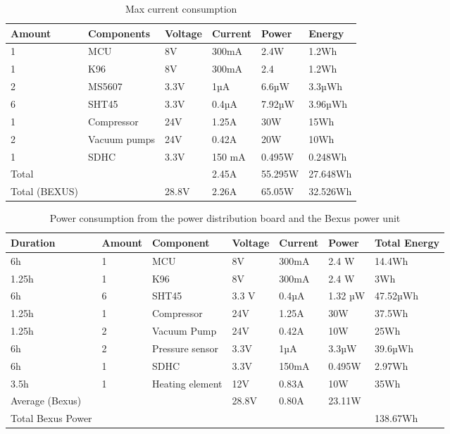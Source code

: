\documentclass[
  a4paper,
  11pt,
  openany,
  parskip,
  toc=totoc,
  listof=totoc,
  bibliography=totoc
]{scrreprt}
\begin{document}
\begin{table}[H]
\centering
\caption{Max current consumption}
\label{tab:current_consumption}
\begin{tabular}{llllll}
\toprule
\textbf{Amount} & \textbf{Components}& \textbf{Voltage} & \textbf{Current} &\textbf{Power} &\textbf{Energy}\\
\midrule
1 & MCU & 8V & 300mA & 2.4W & 1.2Wh\\
1 & K96 & 8V & 300mA & 2.4 & 1.2Wh \\
2 & MS5607 & 3.3V& 1µA & 6.6µW & 3.3µWh \\
6 & SHT45 & 3.3V & 0.4µA & 7.92µW & 3.96µWh \\
1 & Compressor & 24V & 1.25A & 30W & 15Wh \\
2 & Vacuum pumps & 24V & 0.42A & 20W & 10Wh\\
1 & SDHC & 3.3V & 150 mA & 0.495W & 0.248Wh \\
\midrule
Total &&& 2.45A & 55.295W & 27.648Wh\\
Total (BEXUS) &&28.8V& 2.26A & 65.05W & 32.526Wh \\
\bottomrule
\end{tabular}
\end{table}

\begin{table}[H]
\centering
\caption{Power consumption from the power distribution board and the Bexus power unit}
\label{tab:power_consumption}
\begin{tabular}{L{1.6cm}llllll}
\toprule
\textbf{Duration} & \textbf{Amount} & \textbf{Component} & \textbf{Voltage} & \textbf{Current} & \textbf{Power} & \textbf{Total Energy} \\
\midrule
6h & 1 & MCU & 8V & 300mA & 2.4 W & 14.4Wh \\
1.25h & 1 & K96 & 8V & 300mA & 2.4 W & 3Wh \\
6h & 6 & SHT45 & 3.3 V & 0.4µA & 1.32 µW & 47.52µWh \\
1.25h & 1 & Compressor & 24V & 1.25A & 30W & 37.5Wh \\
1.25h & 2 & Vacuum Pump & 24V & 0.42A & 10W & 25Wh \\
6h & 2 & Pressure sensor & 3.3V & 1µA & 3.3µW & 39.6µWh \\
6h & 1 &SDHC &3.3V& 150mA & 0.495W & 2.97Wh \\
3.5h & 1 &Heating element &12V& 0.83A & 10W & 35Wh \\

\midrule
Average (Bexus) & & & 28.8V & 0.80A & 23.11W\\
Total Bexus Power & & & & & & 138.67Wh \\
\bottomrule
\end{tabular}
\end{table}
\end{document}
